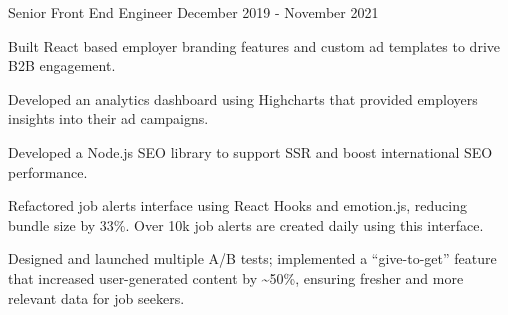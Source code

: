 \begin{cventries}
  \cventry
    {Senior Front End Engineer} %
    { } %
    { } %
    {December 2019 - November 2021} %
    {
      \begin{cvitems} %
        \item {Built React based employer branding features and custom ad templates to drive B2B engagement.}
        \item {Developed an analytics dashboard using Highcharts that provided employers insights into their ad campaigns.}
        \item {Developed a Node.js SEO library to support SSR and boost international SEO performance.}
        \item {Refactored job alerts interface using React Hooks and emotion.js, reducing bundle size by 33\%. Over 10k job alerts are created daily using this interface.}
        \item {Designed and launched multiple A/B tests; implemented a ``give-to-get'' feature that increased user-generated content by \textasciitilde50\%, ensuring fresher and more relevant data for job seekers.}
      \end{cvitems}
    }



\end{cventries}
